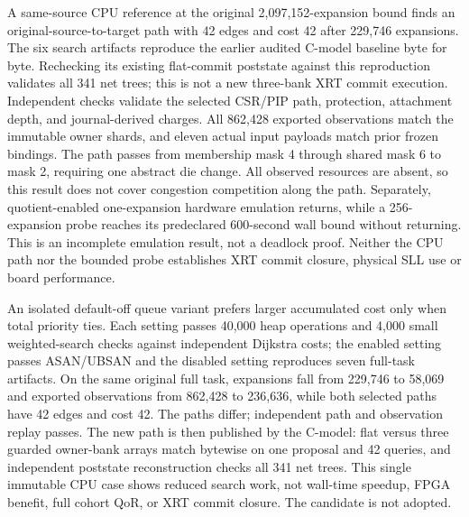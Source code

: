 \documentclass[10pt]{article}
\begin{document}
A same-source CPU reference at the original 2,097,152-expansion bound finds
an original-source-to-target path with 42 edges and cost 42 after 229,746
expansions. The six search artifacts reproduce the earlier audited C-model baseline
byte for byte. Rechecking its existing flat-commit poststate against this
reproduction validates all 341 net trees; this is not a new three-bank
XRT commit execution. Independent checks validate the selected CSR/PIP path,
protection, attachment depth, and journal-derived charges. All 862,428
exported observations match the immutable owner shards, and eleven actual
input payloads match prior frozen bindings. The path passes from membership
mask 4 through shared mask 6 to mask 2, requiring one abstract die change.
All observed resources are absent, so this result does not cover congestion
competition along the path. Separately, quotient-enabled one-expansion
hardware emulation returns, while a 256-expansion probe reaches its
predeclared 600-second wall bound without returning. This is an incomplete
emulation result, not a deadlock proof. Neither the CPU path nor the bounded
probe establishes XRT commit closure, physical SLL use or board performance.

An isolated default-off queue variant prefers larger accumulated cost only
when total priority ties. Each setting passes 40,000 heap operations and
4,000 small weighted-search checks against independent Dijkstra costs;
the enabled setting passes ASAN/UBSAN and the disabled setting reproduces
seven full-task artifacts. On the same original full task, expansions
fall from 229,746 to 58,069 and exported observations from 862,428 to
236,636, while both selected paths have 42 edges and cost 42. The paths
differ; independent path and observation replay passes. The new path is
then published by the C-model: flat versus three guarded owner-bank arrays
match bytewise on one proposal and 42 queries, and independent poststate
reconstruction checks all 341 net trees. This single immutable CPU case
shows reduced search work, not wall-time speedup, FPGA benefit, full
cohort QoR, or XRT commit closure. The candidate is not adopted.
\end{document}
